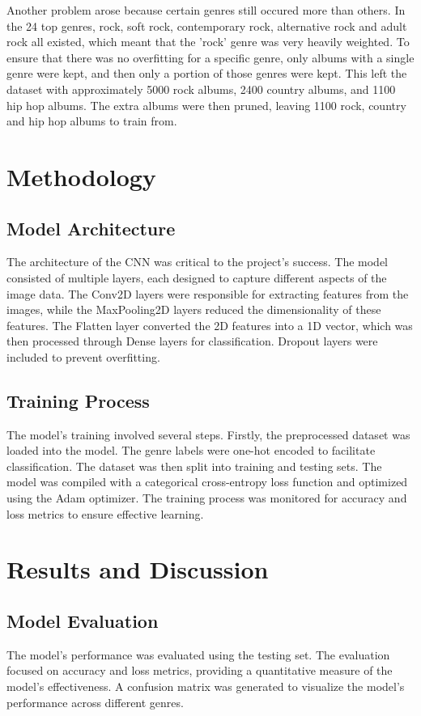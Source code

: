 \documentclass[12pt]{article}
\begin{document}
Another problem arose because certain genres still occured more than others. In the 24 top genres, rock, soft rock, contemporary rock, alternative rock and adult rock all existed, which meant that the 'rock' genre was very heavily weighted. To ensure that there was no overfitting for a specific genre, only albums with a single genre were kept, and then only a portion of those genres were kept. This left the dataset with approximately 5000 rock albums, 2400 country albums, and 1100 hip hop albums. The extra albums were then pruned, leaving 1100 rock, country and hip hop albums to train from.

\section{Methodology}
\subsection{Model Architecture}
The architecture of the CNN was critical to the project's success. The model consisted of multiple layers, each designed to capture different aspects of the image data. The Conv2D layers were responsible for extracting features from the images, while the MaxPooling2D layers reduced the dimensionality of these features. The Flatten layer converted the 2D features into a 1D vector, which was then processed through Dense layers for classification. Dropout layers were included to prevent overfitting.

\subsection{Training Process}
The model's training involved several steps. Firstly, the preprocessed dataset was loaded into the model. The genre labels were one-hot encoded to facilitate classification. The dataset was then split into training and testing sets. The model was compiled with a categorical cross-entropy loss function and optimized using the Adam optimizer. The training process was monitored for accuracy and loss metrics to ensure effective learning.

\section{Results and Discussion}
\subsection{Model Evaluation}
The model's performance was evaluated using the testing set. The evaluation focused on accuracy and loss metrics, providing a quantitative measure of the model's effectiveness. A confusion matrix was generated to visualize the model's performance across different genres.
\end{document}

